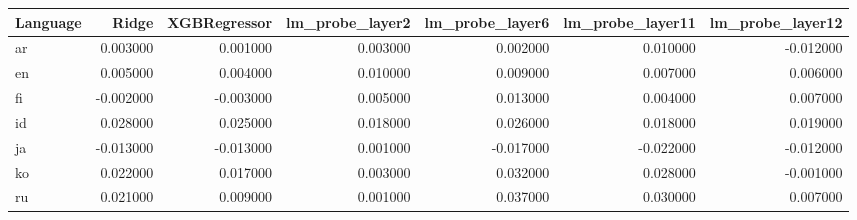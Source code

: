 \begin{tabular}{lrrrrrr}
\toprule
Language & Ridge & XGBRegressor & lm_probe_layer2 & lm_probe_layer6 & lm_probe_layer11 & lm_probe_layer12 \\
\midrule
ar & 0.003000 & 0.001000 & 0.003000 & 0.002000 & 0.010000 & -0.012000 \\
en & 0.005000 & 0.004000 & 0.010000 & 0.009000 & 0.007000 & 0.006000 \\
fi & -0.002000 & -0.003000 & 0.005000 & 0.013000 & 0.004000 & 0.007000 \\
id & 0.028000 & 0.025000 & 0.018000 & 0.026000 & 0.018000 & 0.019000 \\
ja & -0.013000 & -0.013000 & 0.001000 & -0.017000 & -0.022000 & -0.012000 \\
ko & 0.022000 & 0.017000 & 0.003000 & 0.032000 & 0.028000 & -0.001000 \\
ru & 0.021000 & 0.009000 & 0.001000 & 0.037000 & 0.030000 & 0.007000 \\
\bottomrule
\end{tabular}
